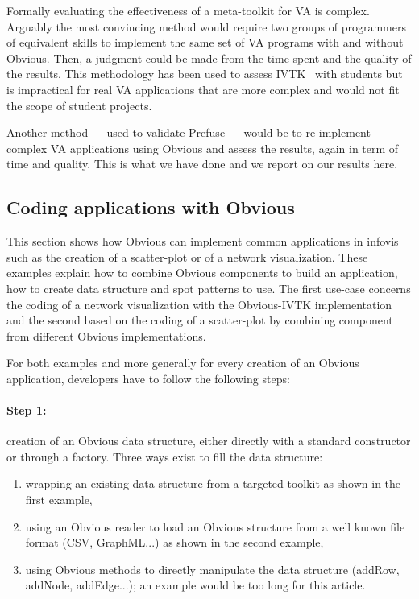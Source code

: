 
Formally evaluating the effectiveness of a meta-toolkit for VA is
complex. Arguably the most convincing method would require two groups
of programmers of equivalent skills to implement the same set of
VA programs with and without Obvious. Then, a judgment
could be made from the time spent and the quality of the results. This
methodology has been used to assess IVTK~\cite{InfoVis} with students
but is impractical for real VA applications that are
more complex and would not fit the scope of student projects.

Another method --- used to validate Prefuse~\cite{Prefuse} -- would be
to re-implement complex VA applications using Obvious
and assess the results, again in term of time and quality. This is
what we have done and we report on our results here.

\subsection{Coding applications with Obvious}

This section shows how Obvious can implement common applications in
infovis such as the creation of a scatter-plot or of
a network visualization.  These examples explain how to combine
Obvious components to build an application, how to create data
structure and spot patterns to use.  The first use-case concerns the
coding of a network visualization with the Obvious-IVTK
implementation and the second based on the coding of a scatter-plot by
combining component from different Obvious implementations.

For both examples and more generally for every creation of an Obvious
application, developers have to follow the following steps:

\paragraph{Step 1:} creation of an Obvious data structure, either
directly with a standard constructor or through a factory.  Three ways
exist to fill the data structure:
\begin{enumerate}[noitemsep]
\item wrapping an existing data structure from a targeted toolkit as
  shown in the first example,
\item using an Obvious reader to load an Obvious structure from a well
  known file format (CSV, GraphML...) as shown in the second example,
\item using Obvious methods to directly manipulate the data structure
  (addRow, addNode, addEdge...); an example would be too long for this
  article.
\end{enumerate}

